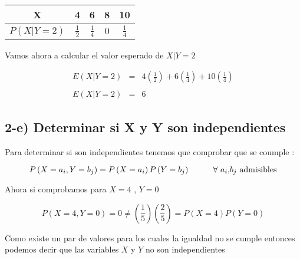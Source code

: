 \documentclass[12pt]{article}
\begin{document}
\begin{center}
    \renewcommand{\arraystretch}{1.5}
    \begin{tabular}{|c|c|c|c|c|}
        \hline
        X                                    & 4              & 6              & 8   & 10
        \\
        \hline
        $\displaystyle P \left(X|Y=2\right)$ & $ \frac{1}{2}$ & $ \frac{1}{4}$ & $0$ & $ \frac{1}{4}$
        \\
        \hline
    \end{tabular}
\end{center}


\begin{flushleft}
    Vamos ahora a calcular el valor esperado de $X|Y=2$
\end{flushleft}

\begin{equation*}
    \begin{array}{rcl}
        \displaystyle E\left(X|Y=2\right) & = & \displaystyle 4 \left(\frac{1}{2}\right) + 6 \left(\frac{1}{4}\right) + 10\left(\frac{1}{4}\right)
        \\
        \\
        \displaystyle E\left(X|Y=2\right) & = & 6
    \end{array}
\end{equation*}


\subsection*{2-e)  Determinar si X y Y  son independientes}

\begin{flushleft}
    Para determinar si son independientes tenemos que comprobar que se coumple :


    \begin{equation*}
        P \left(X = a_i , Y = b_j\right)  = P \left(X = a_i\right) P \left(Y= b_j\right)
        \hspace*{1cm }
        \mbox{$\forall$ $a_i$,$b_j$ admisibles}
    \end{equation*}


    Ahora si comprobamos para $X = 4 $ , $Y = 0$


    \begin{equation*}
        P \left(X =4 , Y =0 \right) = 0 \neq \left(\frac{1}{5}\right) \left(\frac{2}{5}\right)  = P\left(X =4 \right)  P \left(Y = 0\right)
    \end{equation*}


    Como existe un par de valores para los cuales la igualdad no se cumple entonces
    podemos decir que las variables $X$ y $Y$ no son independientes
\end{flushleft}
\end{document}
